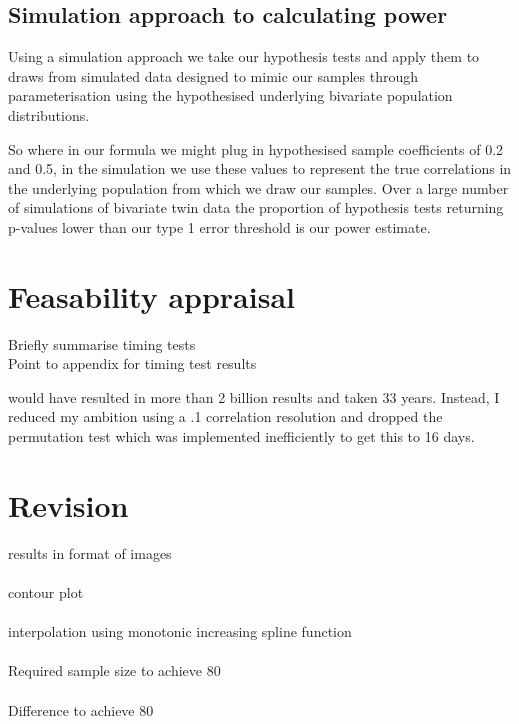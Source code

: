 \subsection{Simulation approach to calculating power}
Using a simulation approach we take our hypothesis tests and apply them to draws from simulated data designed to mimic our samples through parameterisation using the hypothesised underlying bivariate population distributions.  

So where in our formula we might plug in hypothesised sample coefficients of 0.2 and 0.5, in the simulation we use these values to represent the true correlations in the underlying population from which we draw our samples.  Over a large number of simulations of bivariate twin data the proportion of hypothesis tests returning p-values lower than our type 1 error threshold is our power estimate.
  
\section{Feasability appraisal}

Briefly summarise timing tests
\\
Point to appendix for timing test results

would have resulted in more than 2 billion results and taken 33 years.  Instead, I reduced my ambition using a .1 correlation resolution and dropped the permutation test which was implemented inefficiently to get this to 16 days.

\section{Revision}
  
results in format of images
\\
\\
contour plot
\\
\\  
interpolation using monotonic increasing spline function
\\
\\
Required sample size to achieve 80%
\\
\\  
Difference to achieve 80%

